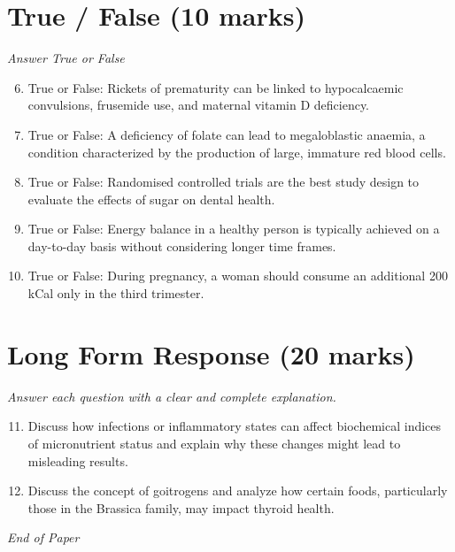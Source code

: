 \documentclass[12pt]{article}
\begin{document}
\section*{True / False (10 marks)}
\textit{Answer True or False}
\begin{enumerate}[label=\arabic*.]
\setcounter{enumi}{5}
\item True or False: Rickets of prematurity can be linked to hypocalcaemic convulsions, frusemide use, and maternal vitamin D deficiency.
\item True or False: A deficiency of folate can lead to megaloblastic anaemia, a condition characterized by the production of large, immature red blood cells.
\item True or False: Randomised controlled trials are the best study design to evaluate the effects of sugar on dental health.
\item True or False: Energy balance in a healthy person is typically achieved on a day-to-day basis without considering longer time frames.
\item True or False: During pregnancy, a woman should consume an additional 200 kCal only in the third trimester.
\end{enumerate}

\section*{Long Form Response (20 marks)}
\textit{Answer each question with a clear and complete explanation.}
\begin{enumerate}[label=\arabic*.]
\setcounter{enumi}{10}
\item Discuss how infections or inflammatory states can affect biochemical indices of micronutrient status and explain why these changes might lead to misleading results.
\item Discuss the concept of goitrogens and analyze how certain foods, particularly those in the Brassica family, may impact thyroid health.
\end{enumerate}

\vfill
\noindent\textit{End of Paper}
\end{document}
